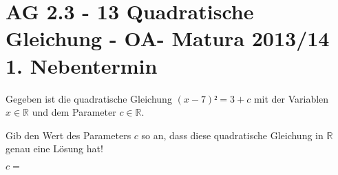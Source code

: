 \section{AG 2.3 - 13 Quadratische Gleichung - OA- Matura 2013/14 1. Nebentermin}

\begin{beispiel}[AG 2.3]{1} %
				Gegeben ist die quadratische Gleichung $(x-7)²=3+c$ mit der Variablen $x\in\mathbb{R}$ und dem Parameter $c\in\mathbb{R}$.
				
				Gib den Wert des Parameters $c$ so an, dass diese quadratische Gleichung in $\mathbb{R}$ genau eine Lösung hat!
				
				$c=$ 
\end{beispiel}